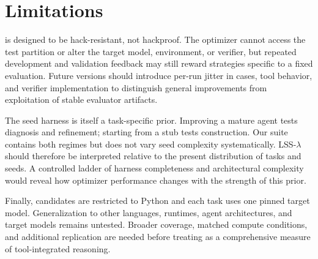 \section*{Limitations}
\label{sec:limitations}
\heb is designed to be hack-resistant, not hackproof. The optimizer cannot access
the test partition or alter the target model, environment, or verifier, but repeated
development and validation feedback may still reward strategies specific to a
fixed evaluation. Future versions should introduce per-run jitter in cases, tool
behavior, and verifier implementation to distinguish general improvements from
exploitation of stable evaluator artifacts.

The seed harness is itself a task-specific prior. Improving a mature agent tests
diagnosis and refinement; starting from a stub tests construction. Our suite
contains both regimes but does not vary seed complexity systematically.
LSS-$\lambda$ should therefore be interpreted relative to the present distribution
of tasks and seeds. A controlled ladder of harness completeness and architectural
complexity would reveal how optimizer performance changes with the strength of
this prior.

Finally, candidates are restricted to Python and each task uses one pinned target
model. Generalization to other languages, runtimes, agent architectures, and
target models remains untested. Broader coverage, matched compute conditions, and
additional replication are needed before treating \heb as a comprehensive measure
of tool-integrated reasoning.

